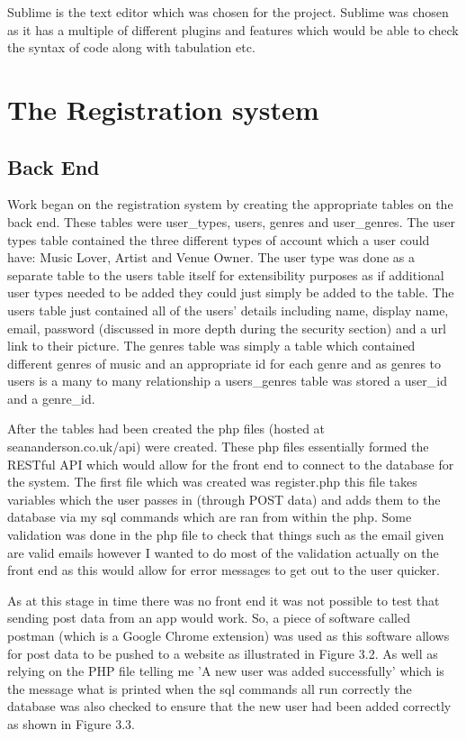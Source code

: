 Sublime is the text editor which was chosen for the project. Sublime was chosen as it has a multiple of different plugins and features which would be able to check the syntax of code along with tabulation etc.

\section{The Registration system}
\subsection{Back End}
Work began on the registration system by creating the appropriate tables on the back end. These tables were user\_types, users, genres and user\_genres. The user types table contained the three different types of account which a user could have: Music Lover, Artist and Venue Owner. The user type was done as a separate table to the users table itself for extensibility purposes as if additional user types needed to be added they could just simply be added to the table. The users table just contained all of the users' details including name, display name, email, password (discussed in more depth during the security section) and a url link to their picture. The genres table was simply a table which contained different genres of music and an appropriate id for each genre and as genres to users is a many to many relationship a users\_genres table was stored a user\_id and a genre\_id.

After the tables had been created the php files (hosted at seananderson.co.uk/api) were created. These php files essentially formed the RESTful API which would allow for the front end to connect to the database for the system. The first file which was created was register.php this file takes variables which the user passes in (through POST data) and adds them to the database via my sql commands which are ran from within the php. Some validation was done in the php file to check that things such as the email given are valid emails however I wanted to do most of the validation actually on the front end as this would allow for error messages to get out to the user quicker. 

As at this stage in time there was no front end it was not possible to test that sending post data from an app would work. So, a piece of software called postman (which is a Google Chrome extension) was used as this software allows for post data to be pushed to a website as illustrated in Figure 3.2. As well as relying on the PHP file telling me 'A new user was added successfully' which is the message what is printed when the sql commands all run correctly the database was also checked to ensure that the new user had been added correctly as shown in Figure 3.3.

